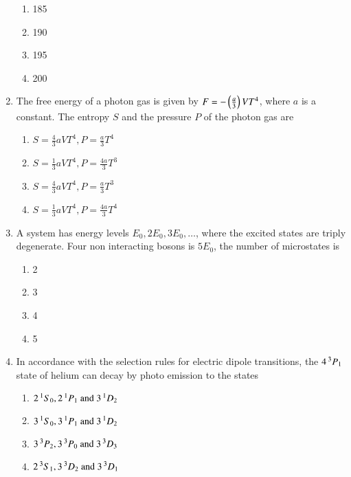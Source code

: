 \documentclass[journal]{IEEEtran}
\begin{document}
\begin{enumerate}
\begin{multicols}{4}
\begin{enumerate}
        \item 185
        \item 190
        \item 195
        \item 200
    \end{enumerate}
\end{multicols}
\item The free energy of a photon gas is given by $F=-\left(\frac{a}{3}\right)VT^4$, where $a$ is a constant. The entropy $S$ and the pressure $P$ of the photon gas are
\begin{multicols}{2}
    \begin{enumerate}
        \item $S=\frac{4}{3}aVT^4, P=\frac{a}{3}T^4$
        \item $S=\frac{1}{3}aVT^4, P=\frac{4a}{3}T^3$
        \item $S=\frac{4}{3}aVT^4, P=\frac{a}{3}T^3$
        \item $S=\frac{1}{3}aVT^4, P=\frac{4a}{3}T^4$
    \end{enumerate}
\end{multicols}
\item A system has energy levels $E_0,2E_0,3E_0,\dots$, where the excited states are triply degenerate. Four non interacting bosons is $5E_0$, the number of microstates is
\begin{multicols}{4}
    \begin{enumerate}
        \item 2
        \item 3
        \item 4
        \item 5
    \end{enumerate}
\end{multicols}
\item In accordance with the selection rules for electric dipole transitions, the $4\prescript{3}{}{P}_1$ state of helium can decay by photo emission to the states
\begin{multicols}{2}
    \begin{enumerate}
        \item $2\prescript{1}{}{S}_0,2\prescript{1}{}{P}_1 \text{ and } 3\prescript{1}{}{D}_2$
        \item $3\prescript{1}{}{S}_0,3\prescript{1}{}{P}_1 \text{ and } 3\prescript{1}{}{D}_2$
        \item $3\prescript{3}{}{P}_2,3\prescript{3}{}{P}_0 \text{ and } 3\prescript{3}{}{D}_3$
        \item $2\prescript{3}{}{S}_1,3\prescript{3}{}{D}_2 \text{ and } 3\prescript{3}{}{D}_1$

\end{enumerate}
\end{multicols}
\end{enumerate}
\end{document}
